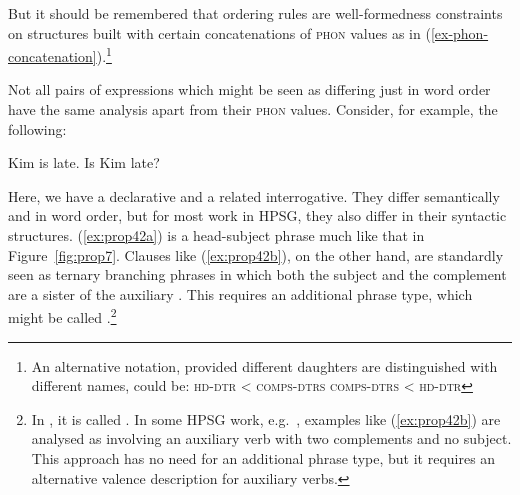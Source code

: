 \documentclass[output=paper
	        ,collection
	        ,collectionchapter
 	        ,biblatex
                ,babelshorthands
                ,newtxmath
                ,draftmode
                ,colorlinks, citecolor=brown
]{langscibook}
\begin{document}
\eal\label{ex:prop41}
\ex\label{ex:prop41a}
\ex\label{ex:prop41b}
\zl
%
But it should be remembered that ordering rules are well-formedness constraints on structures built with certain concatenations of \textsc{phon} values as in (\ref{ex-phon-concatenation}).\footnote{%
   An alternative notation, provided different daughters are distinguished with different names, could be:
   \eal
   \ex \textsc{hd-dtr} < \textsc{comps-dtrs}
   \ex \textsc{comps-dtrs} < \textsc{hd-dtr}
   \zl
}

Not all pairs of expressions which might be seen as differing just in word order have the same
analysis apart from their \textsc{phon} values.\label{page-properties:aux-inversion} Consider, for example, the following:

\eal\label{ex:prop42}
\ex\label{ex:prop42a}
Kim is late.
\ex\label{ex:prop42b}
Is Kim late?
\zl

\noindent
Here, we have a declarative and a related interrogative. They differ semantically and in word order,
but for most work in HPSG, they also differ in their syntactic structures. (\ref{ex:prop42a}) is a
head-subject phrase much like that in Figure~\ref{fig:prop7}. Clauses like (\ref{ex:prop42b}), on
the other hand, are standardly seen as ternary branching phrases in which both the subject and the
complement are a sister of the auxiliary \citep[40]{ps2}. This requires an additional phrase type,
which might be called .\footnote{In \citet[36]{GSag2000a-u}, it
  is called . In some HPSG work, e.g.\ \citet[409--414]{SWB2003a}, examples like
  (\ref{ex:prop42b}) are analysed as involving an auxiliary verb with two complements and no
  subject. This approach has no need for an additional phrase type, but it requires an alternative
  valence description for auxiliary verbs.}
%
\end{document}
